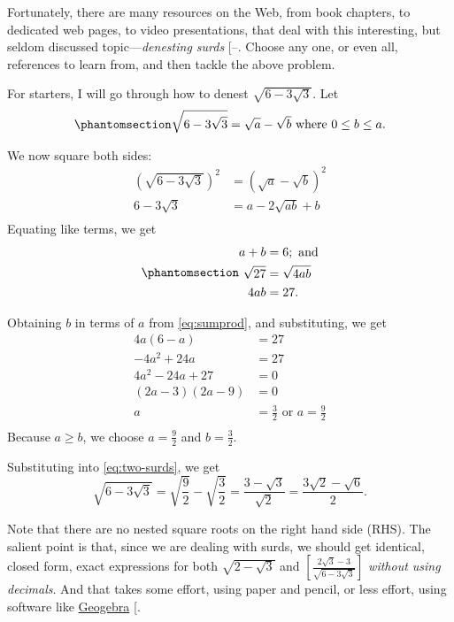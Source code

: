 \documentclass[
  a4paper,
]{article}
\begin{document}
Fortunately, there are many resources on the Web, from book chapters, to
dedicated web pages, to video presentations, that deal with this
interesting, but seldom discussed topic---\emph{denesting surds}
{[}--\citeproc{ref-ds-yt-method}{9}{]}.
Choose any one, or even all, references to learn from, and then tackle
the above problem.

For starters, I will go through how to denest \(\sqrt{6-3\sqrt{3}}\).
Let \begin{equation}\phantomsection\label{eq:two-surds}{
\sqrt{6-3\sqrt{3}} = \sqrt{a} - \sqrt{b} \mbox{ where } 0 \leq b \leq a.
}\end{equation}

We now square both sides: \[
\begin{aligned}
\left(\sqrt{6-3\sqrt{3}}\right)^2 &= \left(\sqrt{a} - \sqrt{b}\right)^2\\
6 - 3\sqrt{3} &= a - 2\sqrt{ab} + b\\
\end{aligned}
\] Equating like terms, we get
\begin{equation}\phantomsection\label{eq:sumprod}{
\begin{aligned}
a + b &= 6; \mbox{ and}\\
\sqrt{27} &= \sqrt{4ab}\\
4ab &= 27.
\end{aligned}
}\end{equation}

Obtaining \(b\) in terms of \(a\) from \cref{eq:sumprod}, and
substituting, we get \[
\begin{aligned}
4a(6-a) &= 27\\
-4a^2 + 24a &= 27\\
4a^2 -24a +27 &= 0\\
(2a - 3)(2a - 9) &=0\\
a &= \tfrac{3}{2} \mbox{ or } a = \tfrac{9}{2}\\
\end{aligned}
\] Because \(a \geq b\), we choose \(a = \frac{9}{2}\) and
\(b = \frac{3}{2}\).

Substituting into \cref{eq:two-surds}, we get \[
\sqrt{6-3\sqrt{3}} = \sqrt{\frac{9}{2}} - \sqrt{\frac{3}{2}} = \frac{3 - \sqrt{3}}{\sqrt{2}} = \frac{3\sqrt{2} - \sqrt{6}}{2}.
\]

Note that there are no nested square roots on the right hand side (RHS).
The salient point is that, since we are dealing with surds, we should
get identical, closed form, exact expressions for both
\(\sqrt{2 - \sqrt{3}}\) and
\(\left[\frac{2\sqrt{3} - 3}{\sqrt{6 - 3\sqrt{3}}}\right]\)
\emph{without using decimals}. And that takes some effort, using paper
and pencil, or less effort, using software like
\href{https://www.geogebra.org/}{Geogebra}
{[}\citeproc{ref-geogebra}{10}{]}.
\end{document}
